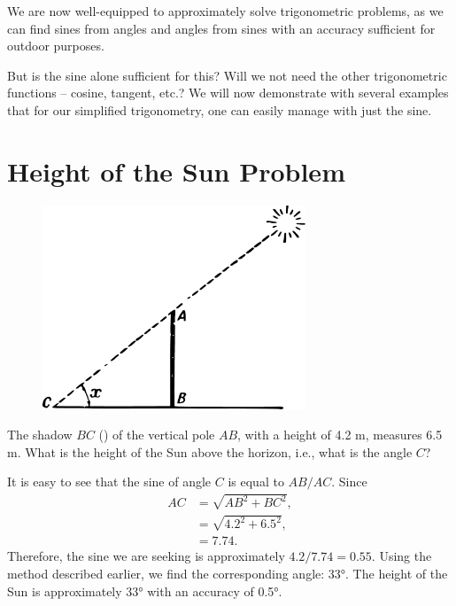 We are now well-equipped to approximately solve trigonometric problems, as we can find sines from angles and angles from sines with an accuracy sufficient for outdoor purposes.

But is the sine alone sufficient for this? Will we not need the other trigonometric functions -- cosine, tangent, etc.? We will now demonstrate with several examples that for our simplified trigonometry, one can easily manage with just the sine.

\section{Height of the Sun Problem}
\label{sec-5.4}

\begin{figure}%
\centering
\includegraphics[width=0.7\textwidth]{figures/ch-05/fig-092.pdf}
\end{figure}

\ques The shadow $BC$ () of the vertical pole $AB$, with a height of 4.2 m, measures 6.5 m. What is the height of the Sun above the horizon, i.e., what is the angle $C$?


\ans It is easy to see that the sine of angle $C$ is equal to $AB/AC$. Since 
\begin{align*}%
AC & = \sqrt{AB^{2} + BC^{2}},\\
& = \sqrt{4.2^{2} + 6.5^{2}},\\ 
& = 7.74. 
\end{align*}
Therefore, the sine we are seeking is approximately $4.2/7.74 = 0.55$. Using the method described earlier, we find the corresponding angle: \ang{33}. The height of the Sun is approximately \ang{33} with an accuracy of \ang{0.5}.

